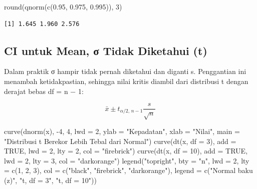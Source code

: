 \documentclass[
  indonesian,
  letterpaper,
]{book}
\newenvironment{Shaded}{\begin{snugshade}}{\end{snugshade}}
\newcommand{\AttributeTok}[1]{\textcolor[rgb]{0.40,0.45,0.13}{#1}}
\newcommand{\ConstantTok}[1]{\textcolor[rgb]{0.56,0.35,0.01}{#1}}
\newcommand{\DecValTok}[1]{\textcolor[rgb]{0.68,0.00,0.00}{#1}}
\newcommand{\FloatTok}[1]{\textcolor[rgb]{0.68,0.00,0.00}{#1}}
\newcommand{\FunctionTok}[1]{\textcolor[rgb]{0.28,0.35,0.67}{#1}}
\newcommand{\NormalTok}[1]{\textcolor[rgb]{0.00,0.23,0.31}{#1}}
\newcommand{\SpecialCharTok}[1]{\textcolor[rgb]{0.37,0.37,0.37}{#1}}
\newcommand{\StringTok}[1]{\textcolor[rgb]{0.13,0.47,0.30}{#1}}
\begin{document}
\begin{Shaded}
\begin{Highlighting}[]
\FunctionTok{round}\NormalTok{(}\FunctionTok{qnorm}\NormalTok{(}\FunctionTok{c}\NormalTok{(}\FloatTok{0.95}\NormalTok{, }\FloatTok{0.975}\NormalTok{, }\FloatTok{0.995}\NormalTok{)), }\DecValTok{3}\NormalTok{)}
\end{Highlighting}
\end{Shaded}

\begin{verbatim}
[1] 1.645 1.960 2.576
\end{verbatim}

\subsection{CI untuk Mean, σ Tidak Diketahui
(t)}\label{ci-untuk-mean-ux3c3-tidak-diketahui-t}

Dalam praktik σ hampir tidak pernah diketahui dan diganti s. Penggantian
ini menambah ketidakpastian, sehingga nilai kritis diambil dari
distribusi t dengan derajat bebas df = n − 1:

\[\bar{x} \pm t_{\alpha/2,\, n-1} \frac{s}{\sqrt{n}}\]

\begin{Shaded}
\begin{Highlighting}[]
\FunctionTok{curve}\NormalTok{(}\FunctionTok{dnorm}\NormalTok{(x), }\SpecialCharTok{{-}}\DecValTok{4}\NormalTok{, }\DecValTok{4}\NormalTok{, }\AttributeTok{lwd =} \DecValTok{2}\NormalTok{, }\AttributeTok{ylab =} \StringTok{"Kepadatan"}\NormalTok{, }\AttributeTok{xlab =} \StringTok{"Nilai"}\NormalTok{,}
\AttributeTok{main =} \StringTok{"Distribusi t Berekor Lebih Tebal dari Normal"}\NormalTok{)}
\FunctionTok{curve}\NormalTok{(}\FunctionTok{dt}\NormalTok{(x, }\AttributeTok{df =} \DecValTok{3}\NormalTok{), }\AttributeTok{add =} \ConstantTok{TRUE}\NormalTok{, }\AttributeTok{lwd =} \DecValTok{2}\NormalTok{, }\AttributeTok{lty =} \DecValTok{2}\NormalTok{, }\AttributeTok{col =} \StringTok{"firebrick"}\NormalTok{)}
\FunctionTok{curve}\NormalTok{(}\FunctionTok{dt}\NormalTok{(x, }\AttributeTok{df =} \DecValTok{10}\NormalTok{), }\AttributeTok{add =} \ConstantTok{TRUE}\NormalTok{, }\AttributeTok{lwd =} \DecValTok{2}\NormalTok{, }\AttributeTok{lty =} \DecValTok{3}\NormalTok{, }\AttributeTok{col =} \StringTok{"darkorange"}\NormalTok{)}
\FunctionTok{legend}\NormalTok{(}\StringTok{"topright"}\NormalTok{, }\AttributeTok{bty =} \StringTok{"n"}\NormalTok{, }\AttributeTok{lwd =} \DecValTok{2}\NormalTok{, }\AttributeTok{lty =} \FunctionTok{c}\NormalTok{(}\DecValTok{1}\NormalTok{, }\DecValTok{2}\NormalTok{, }\DecValTok{3}\NormalTok{), }\AttributeTok{col =} \FunctionTok{c}\NormalTok{(}\StringTok{"black"}\NormalTok{,}
 \StringTok{"firebrick"}\NormalTok{, }\StringTok{"darkorange"}\NormalTok{),}
\AttributeTok{legend =} \FunctionTok{c}\NormalTok{(}\StringTok{"Normal baku (z)"}\NormalTok{, }\StringTok{"t, df = 3"}\NormalTok{, }\StringTok{"t, df = 10"}\NormalTok{))}
\end{Highlighting}
\end{Shaded}
\end{document}
